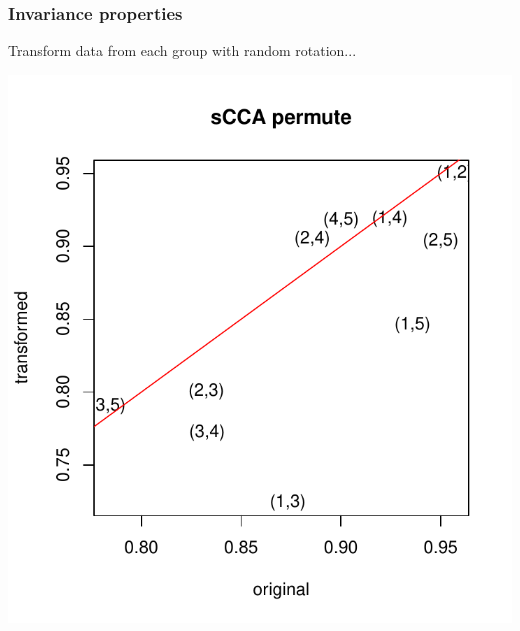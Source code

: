 \documentclass{beamer}
\begin{document}

\begin{frame}
\frametitle{Invariance properties}
Transform data from each group with random rotation...\pause

\begin{center}
\includegraphics[scale = 0.5]{../idloss/cca_p_robustness.pdf}
\end{center}
\end{frame}
\end{document}
